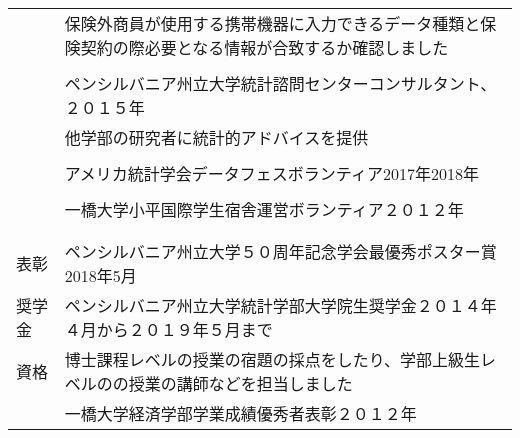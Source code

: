 \documentclass[utf8,letterpaper,oneside]{article}
\begin{document}
\begin{center}
\begin{tabular}{l l}
             & 保険外商員が使用する携帯機器に入力できるデータ種類と保険契約の際必要となる情報が合致するか確認しました         \\
             &                                                                                                                \\
             & ペンシルバニア州立大学統計諮問センターコンサルタント、２０１５年                                               \\
             & 他学部の研究者に統計的アドバイスを提供                                                                         \\
             &                                                                                                                \\
             & アメリカ統計学会データフェスボランティア2017年2018年                                                           \\
             &                                                                                                                \\
             & 一橋大学小平国際学生宿舎運営ボランティア２０１２年                                                             \\
             &                                                                                                                
  \\\hline
             &                                                                                                                \\
  表彰       & ペンシルバニア州立大学５０周年記念学会最優秀ポスター賞2018年5月                                                \\
  奨学金
             &                                                                                                                
  ペンシルバニア州立大学統計学部大学院生奨学金２０１４年４月から２０１９年５月まで                                            \\
  資格       & 博士課程レベルの授業の宿題の採点をしたり、学部上級生レベルのの授業の講師などを担当しました                     \\
  
             & 一橋大学経済学部学業成績優秀者表彰２０１２年                                                                   \\
  

\end{tabular}
\end{center}
\end{document}
